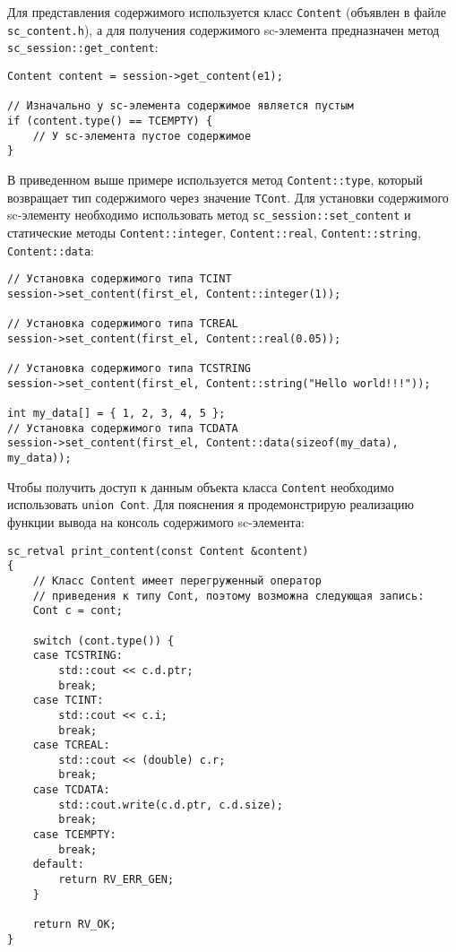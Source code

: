 Для представления содержимого используется класс \lstinline|Content| (объявлен в
файле \verb|sc_content.h|), а для получения содержимого sc-элемента
предназначен метод \lstinline|sc_session::get_content|:

\begin{lstlisting}[texcl]
Content content = session->get_content(e1);

// Изначально у sc-элемента содержимое является пустым
if (content.type() == TCEMPTY) {
    // У sc-элемента пустое содержимое
}
\end{lstlisting}

В приведенном выше примере используется метод
\lstinline|Content::type|, который возвращает тип содержимого через
значение \lstinline|TCont|. Для установки содержимого sc-элементу
необходимо использовать метод \lstinline|sc_session::set_content| и
статические методы \lstinline|Content::integer|,
\lstinline|Content::real|, \lstinline|Content::string|,
\lstinline|Content::data|:
\begin{lstlisting}[texcl]
// Установка содержимого типа TCINT
session->set_content(first_el, Content::integer(1));

// Установка содержимого типа TCREAL
session->set_content(first_el, Content::real(0.05));

// Установка содержимого типа TCSTRING
session->set_content(first_el, Content::string("Hello world!!!"));

int my_data[] = { 1, 2, 3, 4, 5 };
// Установка содержимого типа TCDATA
session->set_content(first_el, Content::data(sizeof(my_data), my_data));
\end{lstlisting}

Чтобы получить доступ к данным объекта класса \lstinline|Content|
необходимо использовать \lstinline|union Cont|. Для пояснения я
продемонстрирую реализацию функции вывода на консоль содержимого
sc-элемента:
\begin{lstlisting}[texcl]
sc_retval print_content(const Content &content)
{
    // Класс Content имеет перегруженный оператор
    // приведения к типу Cont, поэтому возможна следующая запись:
    Cont c = cont;

    switch (cont.type()) {
    case TCSTRING:
        std::cout << c.d.ptr;
        break;
    case TCINT:
        std::cout << c.i;
        break;
    case TCREAL:
        std::cout << (double) c.r;
        break;
    case TCDATA:
        std::cout.write(c.d.ptr, c.d.size);
        break;
    case TCEMPTY:
        break;
    default:
        return RV_ERR_GEN;
    }

    return RV_OK;
}
\end{lstlisting}

